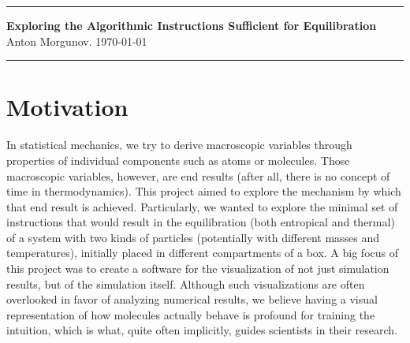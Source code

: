 \documentclass[10pt]{article}
\begin{document}

\noindent\hrule height 2pt %
\vspace{0.5em} %

\begin{center}
    {\Large \textbf{Exploring the Algorithmic Instructions Sufficient for Equilibration}} \\
    \vspace{1em} %
    {\large Anton Morgunov}. {\large \today}
\end{center}

\vspace{0.5em} %
\noindent\hrule height 1pt %




\section{Motivation}
In statistical mechanics, we try to derive macroscopic variables through properties of individual components such as atoms or molecules. Those macroscopic variables, however, are end results (after all, there is no concept of time in thermodynamics). This project aimed to explore the mechanism by which that end result is achieved. Particularly, we wanted to explore the minimal set of instructions that would result in the equilibration (both entropical and thermal) of a system with two kinds of particles (potentially with different masses and temperatures), initially placed in different compartments of a box. A big focus of this project was to create a software for the visualization of not just simulation results, but of the simulation itself. Although such visualizations are often overlooked in favor of analyzing numerical results, we believe having a visual representation of how molecules actually behave is profound for training the intuition, which is what, quite often implicitly, guides scientists in their research.
\end{document}
